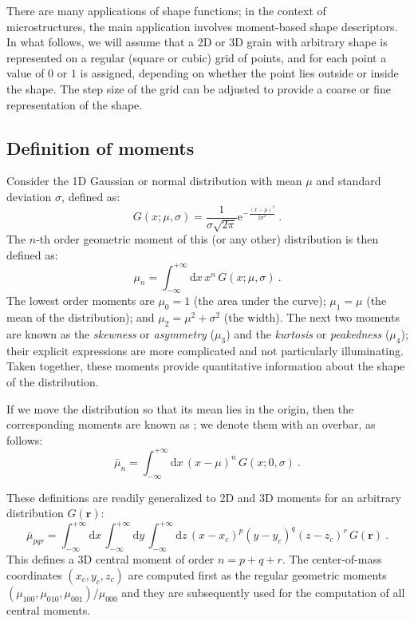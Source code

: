 There are many applications of shape functions; in the context of microstructures, the main application involves moment-based shape descriptors.  In what follows, we will assume that a 2D or 3D grain with arbitrary shape is represented on a regular (square or cubic) grid of points, and for each point a value of $0$ or $1$ is assigned, depending on whether the point lies outside or inside the shape. The step size of the grid can be adjusted to provide a coarse or fine representation of the shape.  

\subsection{Definition of moments}
Consider the 1D Gaussian or normal distribution with mean $\mu$ and standard deviation $\sigma$, defined as:
\begin{equation}
	G(x;\mu,\sigma) = \frac{1}{\sigma\sqrt{2\pi}}\mathrm{e}^{-\frac{(x-\mu)^2}{2\sigma^2}}\ . 
\end{equation}
The $n$-th order geometric moment of this (or any other) distribution is then defined as:
\begin{equation}
	\mu_n = \int_{-\infty}^{+\infty}\!\!\!\mathrm{d}x\,x^n\,G(x;\mu,\sigma)\ .
\end{equation}
The lowest order moments are $\mu_0=1$ (the area under the curve); $\mu_1=\mu$ (the mean of the distribution); and $\mu_2=\mu^2+\sigma^2$ (the width). The next two moments are known as the \textit{skewness} or \textit{asymmetry} ($\mu_3$) and the \textit{kurtosis} or \textit{peakedness} ($\mu_4$); their explicit expressions are more complicated and not particularly illuminating. Taken together, these moments provide quantitative information about the shape of the distribution.  

If we move the distribution so that its mean lies in the origin, then the corresponding moments are known as ; we denote them with an overbar, as follows:
\begin{equation}
	\bar{\mu}_n = \int_{-\infty}^{+\infty}\!\!\!\mathrm{d}x\,(x-\mu)^n\,G(x;0,\sigma)\ .
\end{equation}

These definitions are readily generalized to 2D and 3D moments for an arbitrary distribution $G(\mathbf{r})$:
\begin{equation}
	\bar{\mu}_{pqr} = \int_{-\infty}^{+\infty}\!\!\!\mathrm{d}x\,\int_{-\infty}^{+\infty}\!\!\!\mathrm{d}y\,\int_{-\infty}^{+\infty}\!\!\!\mathrm{d}z\,(x-x_c)^p(y-y_c)^q(z-z_c)^r\,G(\mathbf{r})\ .
\end{equation}
This defines a 3D central moment of order $n=p+q+r$.  The center-of-mass coordinates $(x_c,y_c,z_c)$ are computed first as the regular geometric moments $(\mu_{100},\mu_{010},\mu_{001})/\mu_{000}$ and they are subsequently used for the computation of all central moments.


